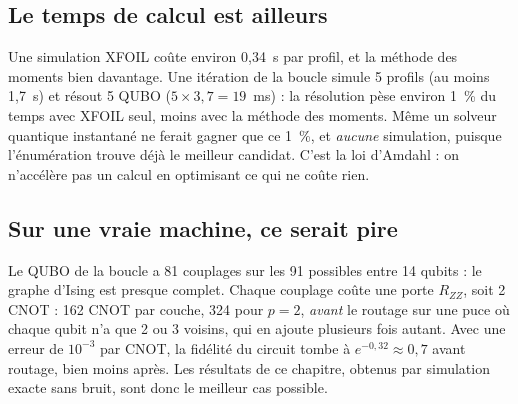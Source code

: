 \subsection{Le temps de calcul est ailleurs}
Une simulation XFOIL coûte environ 0,34~s par profil, et la méthode des moments bien davantage. Une itération de la boucle simule 5 profils (au moins 1,7~s) et résout 5 QUBO ($5\times3{,}7=19$~ms) : la résolution pèse environ 1~\% du temps avec XFOIL seul, moins avec la méthode des moments. Même un solveur quantique instantané ne ferait gagner que ce 1~\%, et \emph{aucune} simulation, puisque l'énumération trouve déjà le meilleur candidat. C'est la loi d'Amdahl : on n'accélère pas un calcul en optimisant ce qui ne coûte rien.

\subsection{Sur une vraie machine, ce serait pire}
Le QUBO de la boucle a 81 couplages sur les 91 possibles entre 14 qubits : le graphe d'Ising est presque complet. Chaque couplage coûte une porte $R_{ZZ}$, soit 2 CNOT : 162 CNOT par couche, 324 pour $p=2$, \emph{avant} le routage sur une puce où chaque qubit n'a que 2 ou 3 voisins, qui en ajoute plusieurs fois autant. Avec une erreur de $10^{-3}$ par CNOT, la fidélité du circuit tombe à $e^{-0{,}32}\approx0{,}7$ avant routage, bien moins après. Les résultats de ce chapitre, obtenus par simulation exacte sans bruit, sont donc le meilleur cas possible.

